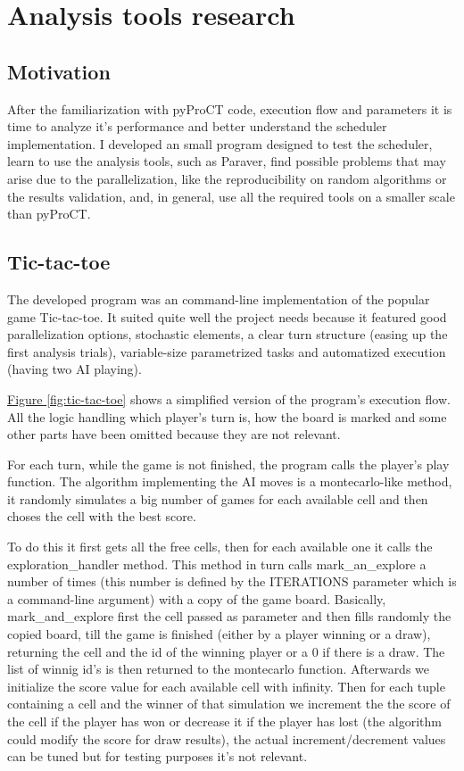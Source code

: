 \section{Analysis tools research}
\label{chap:ttt}

\subsection{Motivation}

After the familiarization with pyProCT code, execution flow and parameters it is time to analyze it's performance and better understand the scheduler implementation. I developed an small program designed to test the scheduler, learn to use the analysis tools, such as Paraver, find possible problems that may arise due to the parallelization, like the reproducibility on random algorithms or the results validation, and, in general, use all the required tools on a smaller scale than pyProCT. 


\subsection{Tic-tac-toe}

The developed program was an command-line implementation of the popular game Tic-tac-toe. It suited quite well the project needs because it featured good parallelization options, stochastic elements, a clear turn structure (easing up the first analysis trials), variable-size parametrized tasks and automatized execution (having two AI playing).

\hyperref[fig:tic-tac-toe]{Figure \ref{fig:tic-tac-toe}} shows a simplified version of the program's execution flow. All the logic handling which player's turn is, how the board is marked and some other parts have been omitted because they are not relevant. 

For each turn, while the game is not finished, the program calls the player's play function. The algorithm implementing the AI moves is a montecarlo-like method, it randomly simulates a big number of games for each available cell and then choses the cell with the best score.

To do this it first gets all the free cells, then for each available one it calls the exploration\_handler method. This method in turn calls mark\_an\_explore a number of times (this number is defined by the ITERATIONS parameter which is a command-line argument) with a copy of the game board. Basically, mark\_and\_explore first the cell passed as parameter and then fills randomly the copied board, till the game is finished (either by a player winning or a draw), returning the cell and the id of the winning player or a 0 if there is a draw. The list of winnig id's is then returned to the montecarlo function. Afterwards we initialize the score value for each available cell with infinity. Then for each tuple containing a cell and the winner of that simulation we increment the the score of the cell if the player has won or decrease it if the player has lost (the algorithm could modify the score for draw results), the actual increment/decrement values can be tuned but for testing purposes it's not relevant. 

